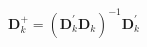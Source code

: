 \begin{equation}
    \mathbf{D}_{k}^{+}
    =
    \left(
    \mathbf{D}_{k}^{\prime}
    \mathbf{D}_{k}
    \right)^{-1}
    \mathbf{D}_{k}^{\prime}
    \label{eq:linearAlgebra-pinv-of-dcap}
\end{equation}